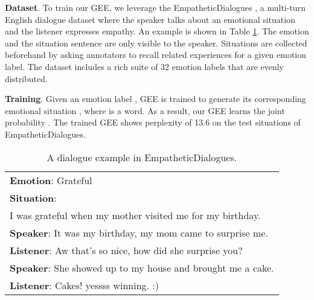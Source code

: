 \documentclass[11pt]{article}
\begin{document}
\textbf{Dataset}.
To train our GEE, we leverage the EmpatheticDialogues \citep{Rashkin:2019:ACL},
a multi-turn English dialogue dataset where the speaker talks about an emotional situation and the listener expresses empathy.
An example is shown in Table \ref{tab:ed_example}.
The emotion and the situation sentence are only visible to the speaker.
Situations are collected beforehand by asking annotators to recall related experiences for a given emotion label.
The dataset includes a rich suite of 32 emotion labels that are evenly distributed.


\textbf{Training}.
Given an emotion label , GEE is trained to generate its corresponding emotional situation , where  is a word.
As a result, our GEE learns the joint probability .
The trained GEE shows perplexity of 13.6 on the test situations of EmpatheticDialogues.




{\renewcommand{\arraystretch}{1.1}
    \begin{table}[t] \begin{center}
    \small
    \setlength{\tabcolsep}{1pt}
    \begin{tabularx}{\linewidth}{X}
        \toprule
        \textbf{Emotion}: Grateful \\
        \textbf{Situation}: \\
        I was grateful when my mother visited me for my birthday. \\
        \midrule
        \textbf{Speaker}: It was my birthday, my mom came to surprise me. \\
        \textbf{Listener}: Aw that's so nice, how did she surprise you? \\
        \textbf{Speaker}: She showed up to my house and brought me a cake. \\
        \textbf{Listener}: Cakes! yessss winning. :) \\
        \bottomrule
    \end{tabularx}
    \vspace{-7pt}
    \caption{A dialogue example in EmpatheticDialogues.} \label{tab:ed_example}
    \vspace{-10pt}
\end{center}\end{table}}
\end{document}
